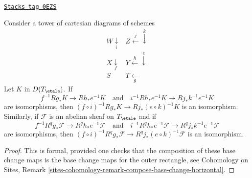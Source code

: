 \begin{lemma}
\label{etale-cohomology-lemma-base-change-compose}
\href{https://stacks.math.columbia.edu/tag/0EZS}{\texttt{Stacks tag 0EZS}}

Consider a tower of cartesian diagrams of schemes
$$
\begin{array}{cc}W \underset{i}{\downarrow} & Z \overset{j}{\longleftarrow}\overset{k}{\downarrow} \\ X \underset{f}{\downarrow} & Y \overset{h}{\longleftarrow}\overset{e}{\downarrow} \\ S & T \underset{g}{\longleftarrow}\end{array}
$$
Let $K$ in $D(T_\etale)$. If
$$
f^{-1}Rg_*K \to Rh_*e^{-1}K
\quad\text{and}\quad
i^{-1}Rh_*e^{-1}K \to Rj_*k^{-1}e^{-1}K
$$
are isomorphisms, then
$(f \circ i)^{-1}Rg_*K \to Rj_*(e \circ k)^{-1}K$
is an isomorphism.
Similarly, if $\mathcal{F}$ is an abelian sheaf on $T_\etale$ and if
$$
f^{-1}R^qg_*\mathcal{F} \to R^qh_*e^{-1}\mathcal{F}
\quad\text{and}\quad
i^{-1}R^qh_*e^{-1}\mathcal{F} \to R^qj_*k^{-1}e^{-1}\mathcal{F}
$$
are isomorphisms, then
$(f \circ i)^{-1}R^qg_*\mathcal{F} \to R^qj_*(e \circ k)^{-1}\mathcal{F}$
is an isomorphism.
\end{lemma}

\begin{proof}
This is formal, provided one checks that the composition of these
base change maps is the base change maps for the outer rectangle, see
Cohomology on Sites, Remark
\ref{sites-cohomology-remark-compose-base-change-horizontal}.
\end{proof}

